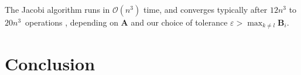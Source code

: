\documentclass[]{article}
\begin{document}
The Jacobi algorithm runs in $\mathcal{O}(n^3)$ time, and converges typically after $12n^3$ to $20n^3$ operations \cite{fys4150-notes}, depending on $\mathbf{A}$ and our choice of tolerance $\varepsilon > \max_{k \neq l} \mathbf{B}_i$.



\section{Conclusion}






\end{document}
